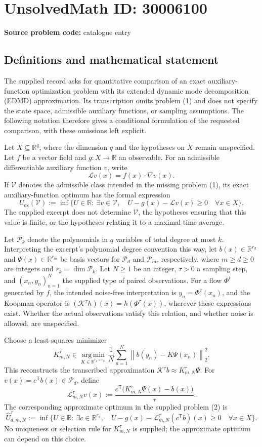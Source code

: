 \documentclass[11pt]{article}
\newcommand{\R}{\mathbb{R}}
\begin{document}
\section*{UnsolvedMath ID: 30006100}
\textbf{Source problem code:} catalogue entry
\subsection{Definitions and mathematical statement}
The supplied record asks for quantitative comparison of an exact auxiliary-function optimization problem with its extended dynamic mode decomposition (EDMD) approximation. Its transcription omits problem (1) and does not specify the state space, admissible auxiliary functions, or sampling assumptions. The following notation therefore gives a conditional formulation of the requested comparison, with these omissions left explicit.

Let \(X\subseteq\R^q\), where the dimension \(q\) and the hypotheses on \(X\) remain unspecified. Let \(f\) be a vector field and \(g:X\to\R\) an observable. For an admissible differentiable auxiliary function \(v\), write
\[
\mathcal L v(x)=f(x)\cdot\nabla v(x).
\]
If \(\mathcal V\) denotes the admissible class intended in the missing problem (1), its exact auxiliary-function optimum has the formal expression
\[
U_{\mathrm{ex}}(\mathcal V)
:=\inf\bigl\{U\in\R:\ \exists v\in\mathcal V,\quad
U-g(x)-\mathcal L v(x)\geq0\quad\forall x\in X\bigr\}.
\]
The supplied excerpt does not determine \(\mathcal V\), the hypotheses ensuring that this value is finite, or the hypotheses relating it to a maximal time average.

Let \(\mathcal P_k\) denote the polynomials in \(q\) variables of total degree at most \(k\). Interpreting the excerpt's polynomial degree convention this way, let \(b(x)\in\R^{r_d}\) and \(\Psi(x)\in\R^{r_m}\) be basis vectors for \(\mathcal P_d\) and \(\mathcal P_m\), respectively, where \(m\geq d\geq0\) are integers and \(r_k=\dim\mathcal P_k\). Let \(N\geq1\) be an integer, \(\tau>0\) a sampling step, and \((x_n,y_n)_{n=1}^N\) the supplied type of paired observations. For a flow \(\Phi^t\) generated by \(f\), the intended noise-free interpretation is \(y_n=\Phi^\tau(x_n)\), and the Koopman operator is \((\mathcal K^\tau h)(x)=h(\Phi^\tau(x))\), wherever these expressions exist. Whether the actual observations satisfy this relation, and whether noise is allowed, are unspecified.

Choose a least-squares minimizer
\[
K_{m,N}^{\tau}\in\operatorname*{arg\,min}_{K\in\R^{r_d\times r_m}}
\frac1N\sum_{n=1}^N\left\|b(y_n)-K\Psi(x_n)\right\|_2^2.
\]
This reconstructs the transcribed approximation \(\mathcal K^\tau b\approx K_{m,N}^{\tau}\Psi\). For \(v(x)=c^{\mathsf T}b(x)\in\mathcal P_d\), define
\[
\mathcal L_{m,N}^{\tau}v(x)
:=\frac{c^{\mathsf T}\bigl(K_{m,N}^{\tau}\Psi(x)-b(x)\bigr)}{\tau}.
\]
The corresponding approximate optimum in the supplied problem (2) is
\[
\widehat U_{d,m,N}^{\tau}
:=\inf\bigl\{U\in\R:\ \exists c\in\R^{r_d},\quad
U-g(x)-\mathcal L_{m,N}^{\tau}(c^{\mathsf T}b)(x)\geq0
\quad\forall x\in X\bigr\}.
\]
No uniqueness or selection rule for \(K_{m,N}^{\tau}\) is supplied; the approximate optimum can depend on this choice.
\end{document}

